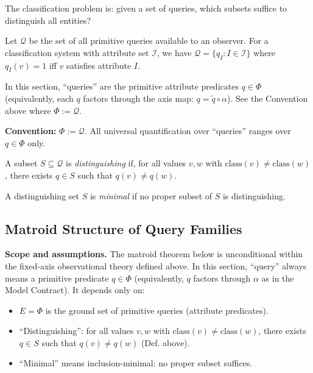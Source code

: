 The classification problem is: given a set of queries, which subsets suffice to distinguish all entities?

\begin{definition}
Let $\mathcal{Q}$ be the set of all primitive queries available to an observer. For a classification system with attribute set $\mathcal{I}$, we have $\mathcal{Q} = \{q_I : I \in \mathcal{I}\}$ where $q_I(v) = 1$ iff $v$ satisfies attribute $I$.
\end{definition}

\noindent In this section, ``queries'' are the primitive attribute predicates $q \in \Phi$ (equivalently, each $q$ factors through the axis map: $q = \tilde{q} \circ \alpha$). See the Convention above where $\Phi := \mathcal{Q}$.

\noindent\textbf{Convention:} $\Phi := \mathcal{Q}$. All universal quantification over ``queries'' ranges over $q \in \Phi$ only.

\begin{definition}
A subset $S \subseteq \mathcal{Q}$ is \emph{distinguishing} if, for all values $v, w$ with $\text{class}(v) \neq \text{class}(w)$, there exists $q \in S$ such that $q(v) \neq q(w)$.
\end{definition}

\begin{definition}
A distinguishing set $S$ is \emph{minimal} if no proper subset of $S$ is distinguishing.
\end{definition}

\subsection{Matroid Structure of Query Families}

\textbf{Scope and assumptions.} The matroid theorem below is unconditional within the fixed-axis observational theory defined above. In this section, ``query'' always means a primitive predicate $q \in \Phi$ (equivalently, $q$ factors through $\alpha$ as in the Model Contract). It depends only on:

\begin{itemize}
\item $E = \Phi$ is the ground set of primitive queries (attribute predicates).
\item ``Distinguishing'': for all values $v,w$ with $\text{class}(v) \neq \text{class}(w)$, there exists $q \in S$ such that $q(v) \neq q(w)$ (Def. above).
\item ``Minimal'' means inclusion-minimal: no proper subset suffices.
\end{itemize}

